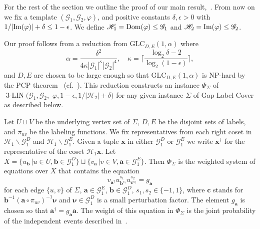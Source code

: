 \documentclass[a4paper,11pt]{article}
\theoremstyle{definition}
\newcommand{\tuple}[1]{{\mathbf{#1}}}
\newcommand{\gr}{\mathscr{G}}
\newcommand{\sgr}{\mathscr{H}}
\newcommand{\bx}{\mathbf{x}}
\newcommand{\glc}{\mathrm{GLC}}
\newcommand{\im}{\textnormal{Im}}
\newcommand{\dom}{\textnormal{Dom}}
\newcommand{\eq}{\ensuremath{\operatorname{3-LIN}}}
\begin{document}
For the rest of the section we outline the proof of our main result,~. From now on we fix a template $(\gr_1, \gr_2, \varphi)$, and positive constants $\delta, \epsilon>0$ with $1/|\im(\varphi)| + \delta \leq 1 - \epsilon$. We define $\sgr_1 =\dom(\varphi) \leq \gr_1$ and $\sgr_2 = \im(\varphi) \leq \gr_2$.


Our proof follows from a reduction from 
$\glc_{D,E}(1,\alpha)$ where 
\[\alpha=\frac{\delta^2}{4\kappa|\gr_1|^\kappa|\gr_2|^{4}}, \quad \kappa=\Bigg\lceil\frac{\log_2\delta -2}{\log_2(1-\epsilon)}\Bigg\rceil,\] and $D,E$ are
chosen to be large enough so that $\glc_{D,E}(1,\alpha)$ is NP-hard by the PCP
theorem~\cite{Arora98:jacm-proof,Arora98:jacm-probabilistic,Raz98}
(cf.~). This reduction constructs an instance $\Phi_\Sigma$ of $\eq(\gr_1, \gr_2,$ $\varphi, 1-\epsilon, 1/|\sgr_2| + \delta)$ for any given instance $\Sigma$ of Gap Label Cover as described below. 

Let $U \sqcup V$ be the underlying vertex set of $\Sigma$, $D, E$ be the disjoint sets of labels, and $\pi_{uv}$ be the labeling functions. 
We fix representatives from each right coset in $\sgr_1\backslash\gr_1^D$ and
$\sgr_1 \backslash \gr_1^E$. Given a tuple $\tuple{x}$ in either $\gr_1^D$ or $\gr_1^E$ we write $\bx^\dagger$ for the representative of the coset $\sgr_1\bx$. 
Let $X= \{
u_\tuple{b} \, \vert u\in U, \tuple{b}\in \gr_1^D 
\} \sqcup \{
v_\tuple{a} \, \vert v\in V, \tuple{a}\in \gr_1^E 
\}$. Then $\Phi_\Sigma$ is the weighted system of equations over $X$ that contains the equation  
\begin{equation}
\label{eq:reduction-def}
v_{\tuple{a}^\dagger} u_{\tuple{b}^{s_1}}^{s_1} u_{\tuple{c}^{s_2}}^{s_2} = g_{\tuple{a}}
\end{equation}
for each edge $\{u,v\}$ of $\Sigma$, $\tuple{a}\in \gr_1^E$, $\tuple{b} \in \gr_1^D$,
$s_1,s_2\in \{-1,1\}$, where  $\tuple{c}$ stands for
$\tuple{b}^{-1} (\tuple{a} \circ \pi_{uv})^{-1}\bm{\nu}$ and  $\bm{\nu} \in \gr_1^D$ is a small perturbation factor. The element $g_\tuple{a}$
is chosen so that $\tuple{a}^\dagger= g_\tuple{a} \tuple{a}$. The weight of this equation in $\Phi_\Sigma$ is the joint probability of the independent events described in~.
\end{document}
